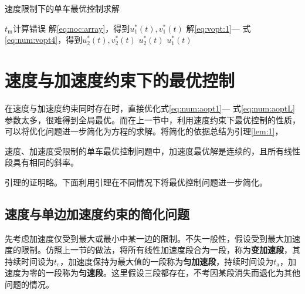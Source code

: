 \begin{algorithm}
\caption{速度限制下的单车最优控制求解}
\label{alg:vsin}
\begin{algorithmic}
  \Statex
      \State $t_\mathrm{m}$计算错误
      \State \Return
    \EndIf
    \State 解\eqref{eq:noc:array}，得到$u_1^*(t),v^*_1(t)$
      \State 解\eqref{eq:vopt:1}--- 式\eqref{eq:num:vopt4}，得到$u_2^*(t),v^*_2(t)$
      \State \Return $u_2^*(t)$
    \Else
      \State \Return $u_1^*(t)$
    \EndIf
  \EndFunction
\end{algorithmic}
\end{algorithm}

\section{速度与加速度约束下的最优控制}
在速度与加速度约束同时存在时，直接优化式\eqref{eq:num:aopt1}--- 式\eqref{eq:num:aoptL}参数太多，很难得到全局最优。而在上一节中，利用速度约束下最优控制的性质，可以将优化问题进一步简化为方程的求解。将简化的依据总结为引理\ref{lem:1}，
\begin{lemma}
速度、加速度受限制的单车最优控制问题中，加速度最优解是连续的，且所有线性段具有相同的斜率。
\label{lem:1}
\end{lemma}

引理的证明略。下面利用引理在不同情况下将最优控制问题进一步简化。

\subsection{速度与单边加速度约束的简化问题}
先考虑加速度仅受到最大或最小中某一边的限制。不失一般性，假设受到最大加速度的限制。仿照上一节的做法，将所有线性加速度段合为一段，称为\textbf{变加速段}，其持续时间设为$t_\mathrm{c}$，加速度保持为最大值的一段称为\textbf{匀加速段}，持续时间设为$t_\mathrm{a}$，加速度为零的一段称为\textbf{匀速段}。这里假设三段都存在，不考因某段消失而退化为其他问题的情况。

